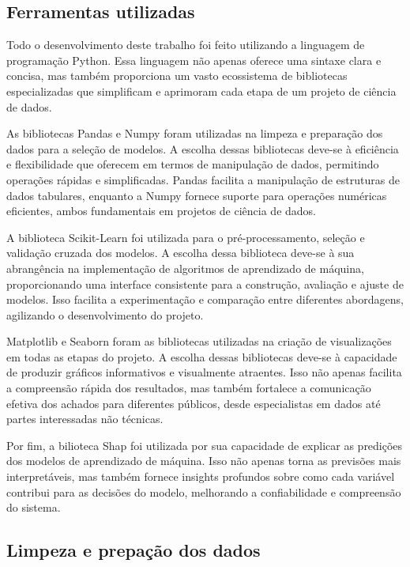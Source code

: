 \subsection{Ferramentas utilizadas}\label{sec:ferramentas}

Todo o desenvolvimento deste trabalho foi feito utilizando a linguagem de programação Python. Essa linguagem não apenas oferece uma sintaxe clara e concisa, mas também proporciona um vasto ecossistema de bibliotecas especializadas que simplificam e aprimoram cada etapa de um projeto de ciência de dados.

As bibliotecas Pandas e Numpy foram utilizadas na limpeza e preparação dos dados para a seleção de modelos. A escolha dessas bibliotecas deve-se à eficiência e flexibilidade que oferecem em termos de manipulação de dados, permitindo operações rápidas e simplificadas. Pandas facilita a manipulação de estruturas de dados tabulares, enquanto a Numpy fornece suporte para operações numéricas eficientes, ambos fundamentais em projetos de ciência de dados.

A biblioteca Scikit-Learn \cite{Buitinck} foi utilizada para o pré-proces\-sa\-men\-to, seleção e validação cruzada dos modelos. A escolha dessa biblioteca deve-se à sua abrangência na implementação de algoritmos de aprendizado de máquina, proporcionando uma interface consistente para a construção, avaliação e ajuste de modelos. Isso facilita a experimentação e comparação entre diferentes abordagens, agilizando o desenvolvimento do projeto.

Matplotlib e Seaborn foram as bibliotecas utilizadas na criação de visualizações em todas as etapas do projeto. A escolha dessas bibliotecas deve-se à capacidade de produzir gráficos informativos e visualmente atraentes. Isso não apenas facilita a compreensão rápida dos resultados, mas também fortalece a comunicação efetiva dos achados para diferentes públicos, desde especialistas em dados até partes interessadas não técnicas.

Por fim, a bilioteca Shap \cite{Shap2017} foi utilizada por sua capacidade de explicar as predições dos modelos de aprendizado de máquina. Isso não apenas torna as previsões mais interpretáveis, mas também fornece insights profundos sobre como cada variável contribui para as decisões do modelo, melhorando a confiabilidade e compreensão do sistema.

\subsection{Limpeza e prepação dos dados}\label{sec:limpeza}

